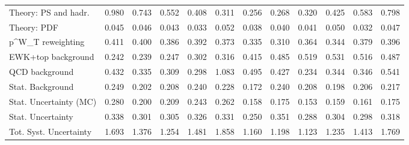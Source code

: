 \begin{tabular}{l|p{0.6cm}p{0.6cm}p{0.6cm}p{0.6cm}p{0.6cm}p{0.6cm}p{0.6cm}p{0.6cm}p{0.6cm}p{0.6cm}p{0.6cm}}
Theory: PS and hadr.                     & 0.980 & 0.743 & 0.552 & 0.408 & 0.311 & 0.256 & 0.268 & 0.320 & 0.425 & 0.583 & 0.798 \\
Theory: PDF                              & 0.045 & 0.046 & 0.043 & 0.033 & 0.052 & 0.038 & 0.040 & 0.041 & 0.050 & 0.032 & 0.047 \\
p^{W}_{T} reweighting                    & 0.411 & 0.400 & 0.386 & 0.392 & 0.373 & 0.335 & 0.310 & 0.364 & 0.344 & 0.379 & 0.396 \\
EWK+top background                       & 0.242 & 0.239 & 0.247 & 0.302 & 0.316 & 0.415 & 0.485 & 0.519 & 0.531 & 0.516 & 0.487 \\
QCD background                           & 0.432 & 0.335 & 0.309 & 0.298 & 1.083 & 0.495 & 0.427 & 0.234 & 0.344 & 0.346 & 0.541 \\
Stat. Background                         & 0.249 & 0.202 & 0.208 & 0.240 & 0.228 & 0.172 & 0.240 & 0.208 & 0.198 & 0.206 & 0.217 \\
Stat. Uncertainty (MC)                   & 0.280 & 0.200 & 0.209 & 0.243 & 0.262 & 0.158 & 0.175 & 0.153 & 0.159 & 0.161 & 0.175 \\
\hline
Stat. Uncertainty                        & 0.338 & 0.301 & 0.305 & 0.326 & 0.331 & 0.250 & 0.351 & 0.288 & 0.304 & 0.298 & 0.318 \\
\hline
Tot. Syst. Uncertainty                   & 1.693 & 1.376 & 1.254 & 1.481 & 1.858 & 1.160 & 1.198 & 1.123 & 1.235 & 1.413 & 1.769 \\
\hline
\end{tabular}
